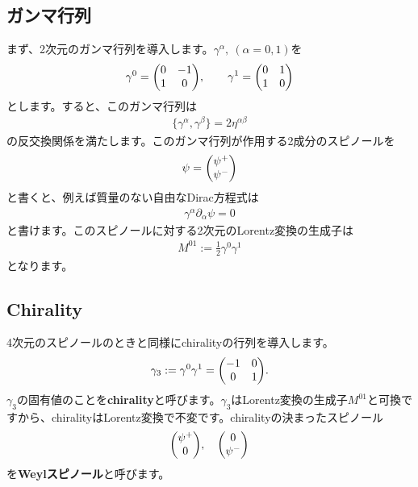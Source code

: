 \documentclass[report,paper=a4, fontsize=12pt, line_length=16cm, number_of_lines=33,dvipdfmx]{jlreq}
\numberwithin{equation}{chapter}
\numberwithin{equation}{section}
\newcommand{\del}{\partial}
\newcommand{\kyou}[1]{{\sffamily \bfseries #1}}
\begin{document}
\subsection{ガンマ行列}\label{subsec:gamma}
まず、2次元のガンマ行列を導入します。$\gamma^{\alpha},\ (\alpha=0,1)$を
\begin{align}
  \gamma^{0}=
  \mqty(0 & -1 \\
    1 &0),\qquad
  \gamma^{1}=
  \mqty(0 & 1 \\
    1 &0)
\end{align}
とします。すると、このガンマ行列は
\begin{align}
  \{\gamma^{\alpha},\gamma^{\beta}\}=2\eta^{\alpha\beta}
\end{align}
の反交換関係を満たします。このガンマ行列が作用する2成分のスピノールを
\begin{align}
  \psi=\mqty(\psi^{+}\\ \psi^{-})
\end{align}
と書くと、例えば質量のない自由なDirac方程式は
\begin{align}
  \gamma^{\alpha}\del_{\alpha}\psi=0
\end{align}
と書けます。このスピノールに対する2次元のLorentz変換の生成子は
\begin{align}
  M^{01}:=\frac{1}{2} \gamma^{0}\gamma^{1}
\end{align}
となります。

\subsection{Chirality}
4次元のスピノールのときと同様にchiralityの行列を導入します。
\begin{align}
  \gamma_{3}:=\gamma^{0}\gamma^{1}
  =\mqty(
    -1 & 0 \\
    0 & 1
  ).
\end{align}
$\gamma_3$の固有値のことを\kyou{chirality}と呼びます。$\gamma_3$はLorentz変換の生成子$M^{01}$と可換ですから、chiralityはLorentz変換で不変です。chiralityの決まったスピノール
\begin{align}
  \mqty(\psi^{+}\\ 0),\quad
  \mqty(0 \\ \psi^{-})
\end{align}
を\kyou{Weylスピノール}と呼びます。
\end{document}

